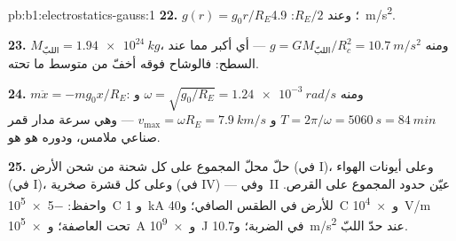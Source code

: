 \begin{solution}{pb:b1:electrostatics-gauss:1}
\textbf{22.} $g(r) = g_0r/R_E$؛ وعند $R_E/2$: \qty{4.9}{m/s^2}.

\textbf{23.} $M_{\text{اللبّ}} = \qty{1.94e24}{kg}$، ومنه $g = GM_{\text{اللبّ}}/R_c^2 =
\qty{10.7}{m/s^2}$ --- أي أكبر مما عند السطح: فالوشاح فوقه
أخفّ من متوسط ما تحته.

\textbf{24.} $m\ddot x = -mg_0x/R_E$: ومنه $\omega = \sqrt{g_0/R_E} = \qty{1.24e-3}{rad/s}$
و $T = 2\pi/\omega = \qty{5060}{s} = \qty{84}{min}$ و $v_{\max} = \omega R_E =
\qty{7.9}{km/s}$ --- وهي سرعة مدار قمر صناعي ملامس، ودوره
هو هو.

\textbf{25.} حلّ محلّ المجموع على كل شحنة من شحن الأرض (في I)،
وعلى أيونات الهواء (في I)، وعلى كل قشرة صخرية (في IV) ---
وفي~II عيّن حدود المجموع على القرص. واحفظ: \qty{-5e5}{C} و
\qty{1}{kA} للأرض في الطقس الصافي؛ و\qty{40}{C} و\qty{e4}{V/m} تحت
العاصفة؛ و\qty{e5}{A} و\qty{e9}{J} في الضربة؛ و\qty{10.7}{m/s^2} عند حدّ
اللبّ.
\end{solution}
